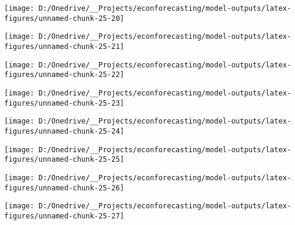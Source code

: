 \documentclass[11pt, letterpaper]{article}\usepackage[]{graphicx}\usepackage[]{color}
\begin{document}
{\centering \texttt{[image: D:/Onedrive/\_\_Projects/econforecasting/model-outputs/latex-figures/unnamed-chunk-25-20]} 

}




{\centering \texttt{[image: D:/Onedrive/\_\_Projects/econforecasting/model-outputs/latex-figures/unnamed-chunk-25-21]} 

}




{\centering \texttt{[image: D:/Onedrive/\_\_Projects/econforecasting/model-outputs/latex-figures/unnamed-chunk-25-22]} 

}




{\centering \texttt{[image: D:/Onedrive/\_\_Projects/econforecasting/model-outputs/latex-figures/unnamed-chunk-25-23]} 

}




{\centering \texttt{[image: D:/Onedrive/\_\_Projects/econforecasting/model-outputs/latex-figures/unnamed-chunk-25-24]} 

}




{\centering \texttt{[image: D:/Onedrive/\_\_Projects/econforecasting/model-outputs/latex-figures/unnamed-chunk-25-25]} 

}




{\centering \texttt{[image: D:/Onedrive/\_\_Projects/econforecasting/model-outputs/latex-figures/unnamed-chunk-25-26]} 

}




{\centering \texttt{[image: D:/Onedrive/\_\_Projects/econforecasting/model-outputs/latex-figures/unnamed-chunk-25-27]} 

}
\end{document}
